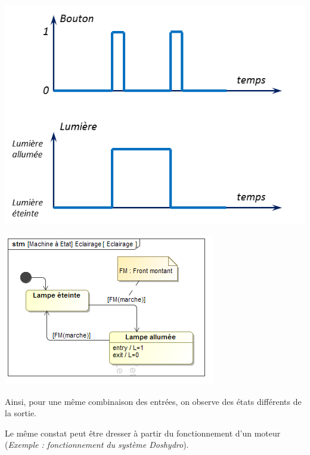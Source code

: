 \documentclass[10pt]{article}
\begin{document}
\begin{minipage}[c]{.47\linewidth}
\begin{center}
\includegraphics[width=.9\textwidth]{images/Chrono1}
\end{center}
\end{minipage} \hfill
\begin{minipage}[c]{.47\linewidth}
\begin{center}
\includegraphics[width=.95\textwidth]{images/stm1}
\end{center}
\end{minipage}

Ainsi, pour une même combinaison des entrées, on observe des états différents de la sortie.

Le même constat peut être dresser à partir du fonctionnement d'un moteur (\textit{Exemple : fonctionnement du système Doshydro}).
\end{document}

